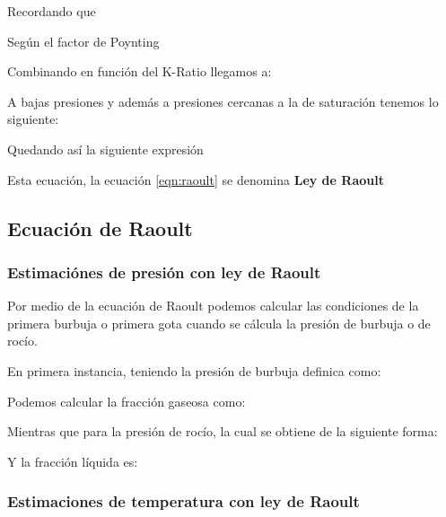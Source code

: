 Recordando que


Según el factor de Poynting


Combinando en función del K-Ratio llegamos a:

A bajas presiones y además a presiones cercanas a la de saturación tenemos lo siguiente:


Quedando así la siguiente expresión


Esta ecuación, la ecuación \ref{eqn:raoult} se denomina \textbf{Ley de Raoult}

\subsection{Ecuación de Raoult}
\subsubsection{Estimaciónes de presión con ley de Raoult}
Por medio de la ecuación de Raoult podemos calcular las condiciones de la primera burbuja o primera gota cuando se cálcula la presión de burbuja o de rocío.

En primera instancia, teniendo la presión de burbuja definica como:


Podemos calcular la fracción gaseosa como:


Mientras que para la presión de rocío, la cual se obtiene de la siguiente forma:


Y la fracción líquida es:
\subsubsection{Estimaciones de temperatura con ley de Raoult}

